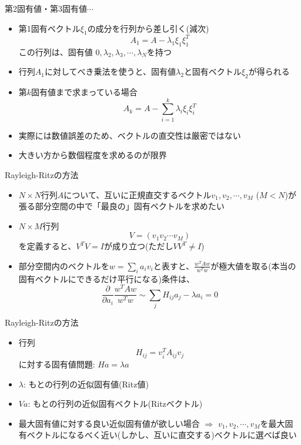 \documentclass[dvipdfmx]{beamer}
\begin{document}
\begin{frame}[t,fragile]{第2固有値・第3固有値$\cdots$}
  \begin{itemize}
  \item 第1固有ベクトル$\xi_1$の成分を行列から差し引く(減次)
    \[
    A_1 = A - \lambda_1 \xi_1 \xi_1^T
    \]
    この行列は、固有値 $0,\lambda_2,\lambda_3,\cdots,\lambda_N$を持つ
  \item 行列$A_1$に対してべき乗法を使うと、固有値$\lambda_2$と固有ベクトル$\xi_2$が得られる
  \item 第$k$固有値まで求まっている場合
    \[
    A_k = A - \sum_{i=1}^k \lambda_i \xi_i \xi_i^T
    \]
  \item 実際には数値誤差のため、ベクトルの直交性は厳密ではない
  \item 大きい方から数個程度を求めるのが限界
  \end{itemize}
\end{frame}

\begin{frame}[t,fragile]{Rayleigh-Ritzの方法}
  \begin{itemize}
    \setlength{\itemsep}{1em}
  \item $N \times N$行列$A$について、互いに正規直交するベクトル$v_1,v_2,\cdots,v_M$ ($M < N$)が張る部分空間の中で「最良の」固有ベクトルを求めたい
  \item $N \times M$行列
    \[
    V=(v_1 v_2 \cdots v_M)
    \]
    を定義すると、$V^TV=I$が成り立つ(ただし$VV^T \ne I$)
  \item 部分空間内のベクトルを$w = \sum_i a_i v_i$と表すと、$\frac{w^TAw}{w^Tw}$が極大値を取る(本当の固有ベクトルにできるだけ平行になる)条件は、
    \[
    \frac{\partial}{\partial a_i} \frac{w^TAw}{w^Tw} \sim \sum_j H_{ij}a_j - \lambda a_i = 0
    \]
  \end{itemize}
\end{frame}

\begin{frame}[t,fragile]{Rayleigh-Ritzの方法}
  \begin{itemize}
    \setlength{\itemsep}{1em}
  \item 行列
    \[
    H_{ij} = v_i^T A_{ij} v_j
    \]
    に対する固有値問題: $H a = \lambda a$
  \item $\lambda$: もとの行列の近似固有値(Ritz値)
  \item $Va$: もとの行列の近似固有ベクトル(Ritzベクトル)
  \item 最大固有値に対する良い近似固有値が欲しい場合 $\Rightarrow$ $v_1,v_2,\cdots,v_M$を最大固有ベクトルになるべく近い(しかし、互いに直交する)ベクトルに選べば良い
  \end{itemize}
\end{frame}
\end{document}

